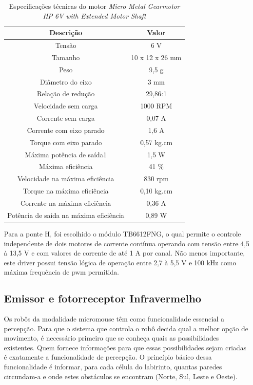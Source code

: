\begin{table}[H]
	\centering
	\captionsetup{justification=centering}
	\caption{Especificações técnicas do motor \textit{Micro Metal Gearmotor HP 6V with Extended Motor Shaft}}
	\label{tab:especificacao_do_motor}
	\begin{tabular}{c|c}
		\hline
		\textbf{Descrição} & \textbf{Valor} \\ \hline
		Tensão & 6 V \\ \hline
		Tamanho & 10 x 12 x 26 mm \\ \hline
		Peso & 9,5 g \\ \hline
		Diâmetro do eixo & 3 mm \\ \hline
		Relação de redução & 29,86:1 \\ \hline
		Velocidade sem carga & 1000 RPM \\ \hline
		Corrente sem carga & 0,07 A \\ \hline
		Corrente com eixo parado & 1,6 A \\ \hline
		Torque com eixo parado & 0,57 kg.cm \\ \hline
		Máxima potência de saída1 & 1,5 W \\ \hline
		Máxima eficiência & 41 \% \\ \hline
		Velocidade na máxima eficiência & 830 rpm \\ \hline
		Torque na máxima eficiência & 0,10 kg.cm \\ \hline
		Corrente na máxima eficiência & 0,36 A \\ \hline
		Potência de saída na máxima eficiência & 0,89 W \\ \hline
	\end{tabular}
\end{table}

Para a ponte H, foi escolhido o módulo TB6612FNG, o qual permite o controle independente de dois motores de corrente contínua operando com tensão entre 4,5 à 13,5 V e com valores de corrente de até 1 A por canal. Não menos importante, este driver possui tensão lógica de operação entre 2,7 à 5,5 V e 100 kHz como máxima frequência de \gls*{pwm} permitida.

\subsection{Emissor e fotorreceptor Infravermelho}
\label{ssec:emissor_e_fotoreceptor_ir}
Os robôs da modalidade micromouse têm como funcionalidade essencial a percepção. Para que o sistema que controla  o robô decida qual a melhor opção de movimento, é necessário primeiro que se conheça quais as possibilidades existentes. Quem fornece informações para que essas possibilidades sejam criadas é exatamente a funcionalidade de percepção. O princípio básico dessa funcionalidade  é informar, para cada célula do labirinto, quantas paredes circundam-a e onde estes obstáculos se encontram (Norte, Sul, Leste e Oeste).

